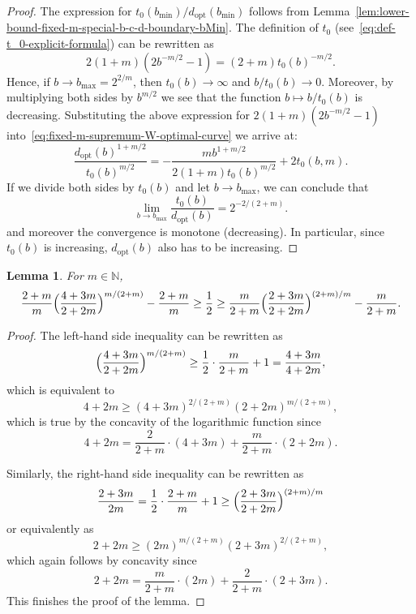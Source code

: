 \documentclass[a4paper]{amsart} %
\newtheorem{lemma}[theorem]{Lemma}
\theoremstyle{definition}
\theoremstyle{remark}
\numberwithin{equation}{section}
\newcommand*{\NN}{\mathbb{N}}
\newcommand*{\bMin}{b_{\min}}
\newcommand*{\bMax}{b_{\max}}
\newcommand*{\dOpt}{d_{\mathrm{opt}}}
\begin{document}
\begin{proof}
	The expression for  $t_0(\bMin)/\dOpt(\bMin)$ 
	follows from Lemma~\ref{lem:lower-bound-fixed-m-special-b-c-d-boundary-bMin}.
	The definition of $t_0$ (see~\eqref{eq:def-t_0-explicit-formula}) 
	can be rewritten as
	\[
	2(1+m) (2b^{-m/2}  -1 ) = (2+m)  t_0(b)^{-m/2}.
	\]
	Hence, if $b\to \bMax = 2^{2/m}$, then $t_0(b) \to \infty$ and $b/t_0(b)\to 0$.
	Moreover, by multiplying both sides by $b^{m/2}$ we see that the function $b\mapsto b/t_0(b)$ is decreasing.
	Substituting the above expression for $2(1+m)(2b^{-m/2} - 1)$
	into~\eqref{eq:fixed-m-supremum-W-optimal-curve} we arrive at:
	\begin{equation*}
	\frac{ \dOpt(b)^{1+m/2}}{ t_0(b)^{m/2}}
	= -\frac{mb^{1+m/2}}{2(1+m) t_0(b)^{m/2}}   
	+ 2 t_0(b,m). 
	\end{equation*}
	If we divide both sides by $t_0(b)$ and let $b\to \bMax$, we can conclude that 
	\[
	\lim_{b\to\bMax}\frac{t_0(b)}{\dOpt(b)}
	= 2^{-2/(2+m)}.
	\]
	and moreover the convergence is monotone (decreasing).
	In particular, since $t_0(b)$ is increasing, $\dOpt(b)$ also has to be increasing.
\end{proof}	


\begin{lemma}
	\label{lem:aux-dOpt-for-bMin}
	For $m\in\NN$,
	\[
	\frac{2+m}{m}\Bigl(\frac{4+3m}{2+2m}\Bigr)^{m/(2+m)} - \frac{2+m}{m} \geq \frac{1}{2} \geq
	\frac{m}{2+m}\Bigl(\frac{2+3m}{2+2m}\Bigr)^{(2+m)/m} - \frac{m}{2+m}.
	\]
\end{lemma}

\begin{proof}
	The left-hand side inequality can be rewritten as 
	\[
	\Bigl(\frac{4+3m}{2+2m}\Bigr)^{m/(2+m)}
	\geq \frac{1}{2}\cdot \frac{m}{2+m} + 1 = \frac{4+3m}{4+2m},
	\]
	which is equivalent to
	\[
	4+2m \geq (4+3m)^{2/(2+m)} (2+2m)^{m/(2+m)},
	\]
	which is true by the concavity of the logarithmic function since
	\[
	4+2m = \frac{2}{2+m}\cdot(4+3m) + \frac{m}{2+m} \cdot  (2+2m).
	\]
	
	Similarly,
	the right-hand side inequality can be rewritten as 
	\[
	\frac{2+3m}{2m} = \frac{1}{2}\cdot \frac{2+m}{m} + 1
	\geq 	\Bigl(\frac{2+3m}{2+2m}\Bigr)^{(2+m)/m}
	\]
	or equivalently as
	\[
	2+2m \geq (2m)^{m/(2+m)} (2+3m)^{2/(2+m)},
	\]
	which again follows by  concavity since
	\[
	2+2m = \frac{m}{2+m}\cdot(2m) + \frac{2}{2+m} \cdot  (2+3m).
	\]
	This finishes the proof of the lemma.
\end{proof}
\end{document}
